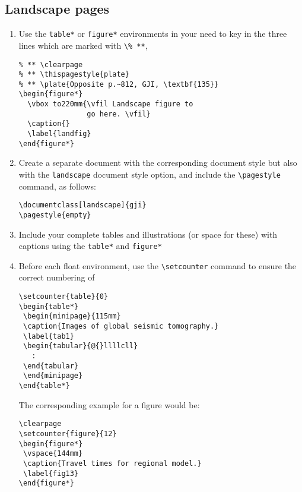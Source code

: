 \subsection{Landscape pages}

\begin{enumerate}
  \item Use the \verb"table*" or \verb"figure*" environments in your
        need to key in the three lines which are marked with \verb"\% **",
\begin{verbatim}
% ** \clearpage
% ** \thispagestyle{plate}
% ** \plate{Opposite p.~812, GJI, \textbf{135}}
\begin{figure*}
  \vbox to220mm{\vfil Landscape figure to
                go here. \vfil}
  \caption{}
  \label{landfig}
\end{figure*}
\end{verbatim}
\item Create a separate document with the corresponding document style
      but also with the \verb"landscape" document style option, and
      include the \verb"\pagestyle" command, as follows:
\begin{verbatim}
\documentclass[landscape]{gji}
\pagestyle{empty}
\end{verbatim}
  \item Include your complete tables and illustrations (or space for
        these) with captions using the \verb"table*" and \verb"figure*"
  \item Before each float environment, use the
        \verb"\setcounter" command to ensure the correct numbering of
\begin{verbatim}
\setcounter{table}{0}
\begin{table*}
 \begin{minipage}{115mm}
 \caption{Images of global seismic tomography.}
 \label{tab1}
 \begin{tabular}{@{}llllcll}
   :
 \end{tabular}
 \end{minipage}
\end{table*}
\end{verbatim}
The corresponding example for a figure would be:
\begin{verbatim}
\clearpage
\setcounter{figure}{12}
\begin{figure*}
 \vspace{144mm}
 \caption{Travel times for regional model.}
 \label{fig13}
\end{figure*}
\end{verbatim}
\end{enumerate}


